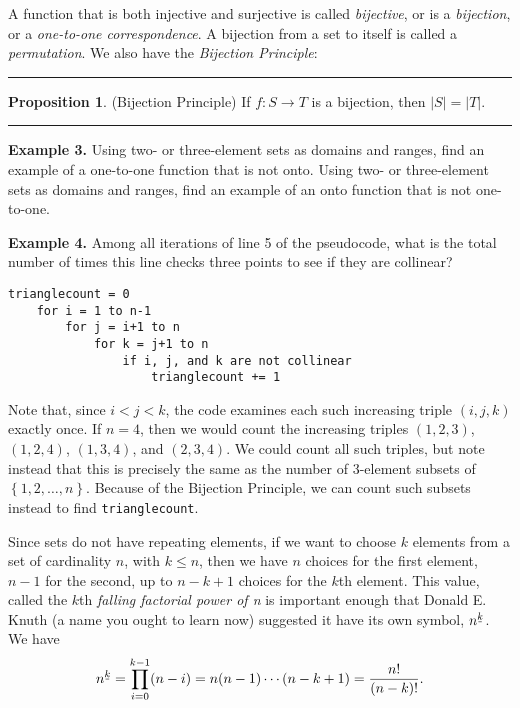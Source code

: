 \documentclass[12pt, letterpaper]{article}
\theoremstyle{definition}
\newtheorem{propt}{Proposition}
\newenvironment{prop}[1]{%
    \vspace*{0.2in}
    ~\newline\noindent
    \begin{minipage}{\linewidth}
    \rule{\textwidth}{2pt}
        \begin{propt}
}
{%
        \end{propt}
    \rule{\textwidth}{2pt}
    \end{minipage}
    \vspace*{0.2in}
    \linebreak
}
\newcommand{\fallingfactorial}[1]{%
  ^{\mspace{2mu}\underline{\mspace{-2mu}#1\mspace{-2mu}}\mspace{2mu}}%
}
\begin{document}
A function that is both injective and surjective is called \emph{bijective},
or is a \emph{bijection}, or a \emph{one-to-one correspondence}. A bijection
from a set to itself is called a \emph{permutation}. We also have the
\emph{Bijection Principle}:
\begin{prop}
    \textbf{(Bijection Principle)}
    If $f : S \to T$ is a bijection, then $|S| = |T|$.
\end{prop}


\vspace*{0.2in}\noindent
\textbf{Example 3.}
Using two- or three-element sets as domains and ranges, find an example
of a one-to-one function that is not onto.
Using two- or three-element sets as domains and ranges, find an example
of an onto function that is not one-to-one.

\clearpage\pagebreak\noindent
\textbf{Example 4.}
Among all iterations of line 5 of the pseudocode, what is the total number
of times this line checks three points to see if they are collinear?

\begin{center}
    \begin{lstlisting}[label=ex4, caption={Example 4 Code}]
    trianglecount = 0
    for i = 1 to n-1
        for j = i+1 to n
            for k = j+1 to n
                if i, j, and k are not collinear
                    trianglecount += 1
    \end{lstlisting}
\end{center}

Note that, since $i < j < k$, the code examines each such increasing triple
$(i, j, k)$ exactly once. If $n = 4$, then we would count the increasing triples
$(1,2,3)$, $(1,2,4)$, $(1,3,4)$, and $(2,3,4)$. We could count all such triples,
but note instead that this is precisely the same as the number of 3-element
subsets of $\left\{ 1, 2, \dots, n \right\}$. Because of the Bijection Principle,
we can count such subsets instead to find \texttt{trianglecount}.

Since sets do not have repeating elements, if we want to choose $k$ elements
from a set of cardinality $n$, with $k \leq n$, then we have $n$ choices
for the first element, $n-1$ for the second, up to $n-k+1$ choices for the
$k$th element. This value, called the $k$th \emph{falling factorial power of n}
is important enough that Donald E. Knuth (a name you ought to learn now)
suggested it have its own symbol, $n \fallingfactorial{k}$. We have
\begin{equation*}
    n\fallingfactorial{k} = \prod_{i=0}^{k-1}(n-i) = n(n-1)\cdots(n-k+1) = \frac{n!}{(n-k)!}.
\end{equation*}
\end{document}

